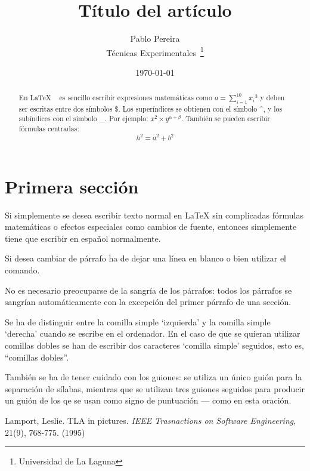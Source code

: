 \documentclass[a4paper,12pt]{article}
\begin{document}
\title{Título del artículo}
\author{Pablo Pereira \\
Técnicas Experimentales~\footnote{Universidad de La Laguna}
}
\date{\today}
\maketitle
\begin{abstract}
En \LaTeX{} ~\cite{Lam:86} es sencillo escribir expresiones
matemáticas como $a=\sum_{i=1}^{10} {x_i}^{3}$
y deben ser escritas entre dos símbolos \$.
Los superíndices se obtienen con el símbolo \^{}, y
los subíndices con el símbolo \_.
Por ejemplo: $x^2 \times y^{\alpha + \beta}$.
También se pueden escribir fórmulas centradas:
\[h^2=a^2 + b^2 \]
\end{abstract}

\section{Primera sección}
Si simplemente se desea escribir texto normal en LaTeX
sin complicadas f\'ormulas matem\'aticas o efectos especiales
como cambios de fuente, entonces simplemente tiene que escribir 
en espa\~nol normalmente. \par
Si desea cambiar de párrafo ha de dejar una línea en blanco o bien
utilizar el comando. \par
No es necesario preocuparse de la sangría de los párrafos:
todos los párrafos se sangrían automáticamente con la excepción 
del primer párrafo de una sección.

Se ha de distinguir entre la comilla simple `izquierda' 
y la comilla simple `derecha' cuando se escribe en el ordenador.
En el caso de que se quieran utilizar comillas dobles se han de 
escribir dos caracteres  `comilla simple' seguidos, esto es,
``comillas dobles''.

También se ha de tener cuidado con los guiones: se utiliza un único
guión para la separación de sílabas, mientras que se utilizan 
tres guiones seguidos para producir un guión de los qe se usan 
como signo de puntuación --- como en esta oración.
\begin{thebibliography}{00}
Lamport, Leslie.
TLA in pictures.
\emph{IEEE Trasnactions on Software Engineering},
21(9), 768-775.
(1995)
\end{thebibliography}
\end{document}
